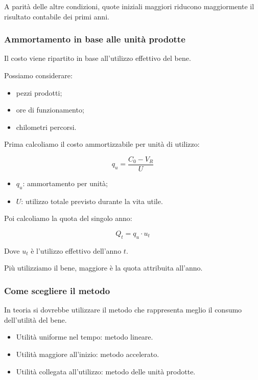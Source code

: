 \noindent A parità delle altre condizioni,
quote iniziali maggiori
riducono maggiormente
il risultato contabile dei primi anni.


\subsubsection*{Ammortamento in base alle unità prodotte}

\noindent Il costo viene ripartito
in base all'utilizzo effettivo del bene.

\noindent Possiamo considerare:

\begin{itemize}
    \item pezzi prodotti;
    \item ore di funzionamento;
    \item chilometri percorsi.
\end{itemize}

\noindent Prima calcoliamo
il costo ammortizzabile
per unità di utilizzo:

\[
\boxed{
q_u=\frac{C_0-V_R}{U}
}
\]

\begin{itemize}
    \item $q_u$: ammortamento per unità;
    \item $U$: utilizzo totale previsto
    durante la vita utile.
\end{itemize}

\noindent Poi calcoliamo
la quota del singolo anno:

\[
\boxed{
Q_t=q_u\cdot u_t
}
\]

\noindent Dove $u_t$
è l'utilizzo effettivo dell'anno $t$.

\noindent Più utilizziamo il bene,
maggiore è la quota attribuita all'anno.


\subsubsection*{Come scegliere il metodo}

\noindent In teoria si dovrebbe utilizzare
il metodo che rappresenta meglio
il consumo dell'utilità del bene.

\begin{itemize}
    \item Utilità uniforme nel tempo:
    metodo lineare.

    \item Utilità maggiore all'inizio:
    metodo accelerato.

    \item Utilità collegata all'utilizzo:
    metodo delle unità prodotte.
\end{itemize}

